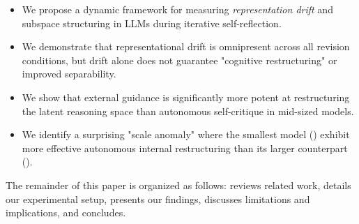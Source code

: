 \begin{itemize}[leftmargin=*,itemsep=0pt,topsep=0pt]
    \item We propose a dynamic framework for measuring \textit{representation drift} and subspace structuring in LLMs during iterative self-reflection.
    \item We demonstrate that representational drift is omnipresent across all revision conditions, but drift alone does not guarantee "cognitive restructuring" or improved separability.
    \item We show that external guidance is significantly more potent at restructuring the latent reasoning space than autonomous self-critique in mid-sized models.
    \item We identify a surprising "scale anomaly" where the smallest model (\qwenzerofive) exhibit more effective autonomous internal restructuring than its larger counterpart (\qwenonefive).
\end{itemize}

The remainder of this paper is organized as follows:  reviews related work,  details our experimental setup,  presents our findings,  discusses limitations and implications, and  concludes.
